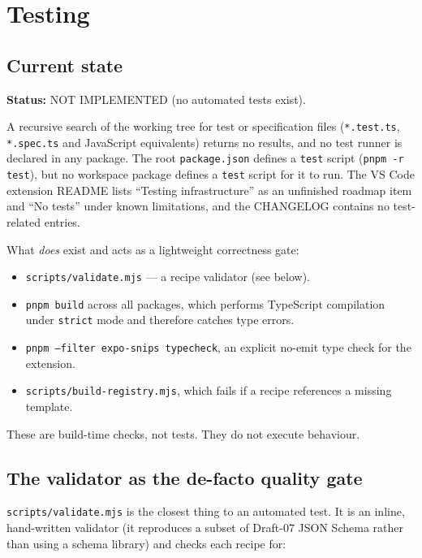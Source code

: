 \chapter{Testing}
\label{ch:testing}

\section{Current state}

\textbf{Status:} NOT IMPLEMENTED (no automated tests exist).

A recursive search of the working tree for test or specification files
(\texttt{*.test.ts}, \texttt{*.spec.ts} and JavaScript equivalents) returns no
results, and no test runner is declared in any package. The root
\texttt{package.json} defines a \texttt{test} script (\texttt{pnpm -r test}),
but no workspace package defines a \texttt{test} script for it to run. The VS
Code extension README lists ``Testing infrastructure'' as an unfinished roadmap
item and ``No tests'' under known limitations, and the CHANGELOG contains no
test-related entries.

What \emph{does} exist and acts as a lightweight correctness gate:

\begin{itemize}
  \item \texttt{scripts/validate.mjs} --- a recipe validator (see below).
  \item \texttt{pnpm build} across all packages, which performs TypeScript
        compilation under \texttt{strict} mode and therefore catches type
        errors.
  \item \texttt{pnpm --filter expo-snips typecheck}, an explicit no-emit type
        check for the extension.
  \item \texttt{scripts/build-registry.mjs}, which fails if a recipe references a
        missing template.
\end{itemize}

These are build-time checks, not tests. They do not execute behaviour.

\section{The validator as the de-facto quality gate}

\texttt{scripts/validate.mjs} is the closest thing to an automated test. It is
an inline, hand-written validator (it reproduces a subset of Draft-07 JSON
Schema rather than using a schema library) and checks each recipe for:


